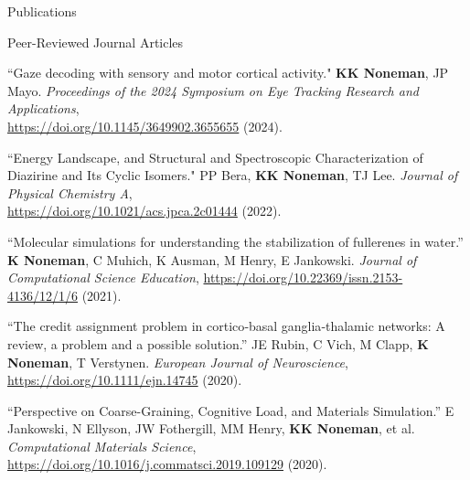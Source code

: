 \documentclass{resume} %
\begin{document}
\begin{rSection}{Publications}
\begin{rSubsection4}{Peer-Reviewed Journal Articles}{}{}{}
\item “Gaze decoding with sensory and motor cortical activity." \textbf{KK Noneman}, JP Mayo. \textit{Proceedings of the 2024 Symposium on Eye Tracking Research and Applications},\\ \href{https://doi.org/10.1145/3649902.3655655}{https://doi.org/10.1145/3649902.3655655} (2024).
\item “Energy Landscape, and Structural and Spectroscopic Characterization of Diazirine and Its Cyclic Isomers." PP Bera, \textbf{KK Noneman}, TJ Lee. \textit{Journal of Physical Chemistry A}, \\ \href{https://doi.org/10.1021/acs.jpca.2c01444}{https://doi.org/10.1021/acs.jpca.2c01444} (2022).
\item “Molecular simulations for understanding the stabilization of fullerenes in water.” \textbf{K Noneman}, C Muhich, K Ausman, M Henry, E Jankowski. \textit{Journal of Computational Science Education}, \href{https://doi.org/10.22369/issn.2153-4136/12/1/6}{https://doi.org/10.22369/issn.2153-4136/12/1/6} (2021).
\item “The credit assignment problem in cortico‐basal ganglia‐thalamic networks: A review, a problem and a possible solution.” JE Rubin, C Vich, M Clapp, \textbf{K Noneman}, T Verstynen. \textit{European Journal of Neuroscience}, \href{https://doi.org/10.1111/ejn.14745}{https://doi.org/10.1111/ejn.14745} (2020).
\item “Perspective on Coarse-Graining, Cognitive Load, and Materials Simulation.” E Jankowski, N Ellyson, JW Fothergill, MM Henry, \textbf{KK Noneman}, et al. \textit{Computational Materials Science}, \href{https://doi.org/10.1016/j.commatsci.2019.109129}{https://doi.org/10.1016/j.commatsci.2019.109129} (2020).
\end{rSubsection4}
    

\end{rSection}
\end{document}
